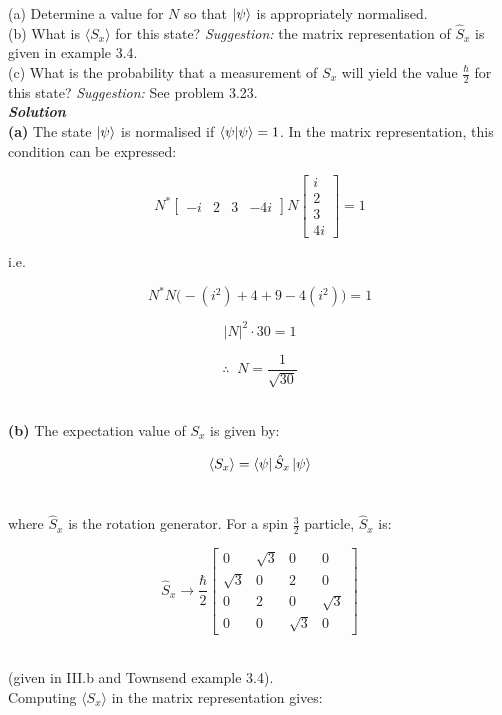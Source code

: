 \documentclass[9pt]{extarticle}
\newcommand{\bfit}[1]{\textbf{\textit{#1}}}
\begin{document}
\begin{multicols*}{2}
(a) Determine a value for $N$ so that $\ket{\psi}$ is appropriately normalised. \\

(b) What is $\langle S_x \rangle$ for this state? {\it Suggestion:} the matrix representation of $\hat S_x$ is given in example 3.4. \\

(c) What is the probability that a measurement of $S_x$ will yield the value $\frac \hbar 2$ for this state? {\it Suggestion:} See problem 3.23. \\ 

{\bfit{Solution}} \\ 

{\bf (a)} The state $\ket{\psi}$ is normalised if $\bra{\psi}\ket{\psi} = 1$. In the matrix representation, this condition can be expressed:

$$
N^*
\begin{bmatrix}
	-i & 2 & 3 & -4i
\end{bmatrix}
N
\begin{bmatrix}
	i \\ 
	2 \\ 
	3 \\ 
	4i
\end{bmatrix}
= 1
$$

i.e. 

$$N^* N \bigg( -(i^2) + 4 + 9 -4(i^2) \bigg) = 1$$

$$|N|^2 \cdot 30 = 1$$

$$\therefore \;\; N = \frac{1}{\sqrt{30}}$$ \ 

{\bf (b)} The expectation value of $S_x$ is given by:

$$\langle S_x \rangle = \bra{\psi} \hat S_x \ket{\psi}$$ \ 

where $\hat S_x$ is the rotation generator. For a spin $\frac 32$ particle, $\hat S_x$ is:

$$
\hat S_x \longrightarrow \frac \hbar 2
\begin{bmatrix}
        0 & \sqrt 3 & 0 & 0 \\
        \sqrt 3 & 0 & 2 & 0 \\
        0 & 2 & 0 & \sqrt 3 \\
        0 & 0 & \sqrt 3 & 0
\end{bmatrix}
$$ \ 

(given in III.b and Townsend example 3.4). \\ 

Computing $\langle S_x \rangle$ in the matrix representation gives:


\end{multicols*}
\end{document}
